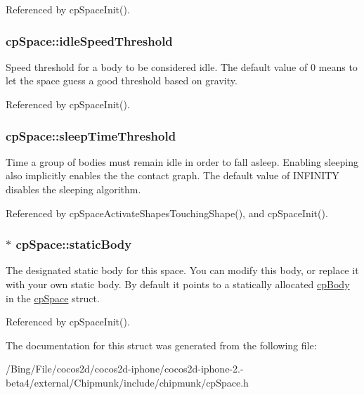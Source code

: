 Referenced by cp\-Space\-Init().

\hypertarget{structcp_space_a88ffce371610f2b94997160de703f1cd}{
\subsubsection[{idle\-Speed\-Threshold}]{ {\bf cp\-Space\-::idle\-Speed\-Threshold}}}\label{structcp_space_a88ffce371610f2b94997160de703f1cd}
Speed threshold for a body to be considered idle. The default value of 0 means to let the space guess a good threshold based on gravity. 

Referenced by cp\-Space\-Init().

\hypertarget{structcp_space_a928d74741904aae266a9efff5b5f68f7}{
\subsubsection[{sleep\-Time\-Threshold}]{ {\bf cp\-Space\-::sleep\-Time\-Threshold}}}\label{structcp_space_a928d74741904aae266a9efff5b5f68f7}
Time a group of bodies must remain idle in order to fall asleep. Enabling sleeping also implicitly enables the the contact graph. The default value of I\-N\-F\-I\-N\-I\-T\-Y disables the sleeping algorithm. 

Referenced by cp\-Space\-Activate\-Shapes\-Touching\-Shape(), and cp\-Space\-Init().

\hypertarget{structcp_space_aa7cb4add8933036493bf7f4ee98ad13e}{
\subsubsection[{static\-Body}]{$\ast$ {\bf cp\-Space\-::static\-Body}}}\label{structcp_space_aa7cb4add8933036493bf7f4ee98ad13e}
The designated static body for this space. You can modify this body, or replace it with your own static body. By default it points to a statically allocated \hyperlink{structcp_body}{cp\-Body} in the \hyperlink{structcp_space}{cp\-Space} struct. 

Referenced by cp\-Space\-Init().



The documentation for this struct was generated from the following file\-:\begin{DoxyCompactItemize}
\item 
/\-Bing/\-File/cocos2d/cocos2d-\/iphone/cocos2d-\/iphone-\/2.-\/beta4/external/\-Chipmunk/include/chipmunk/cp\-Space.\-h\end{DoxyCompactItemize}
